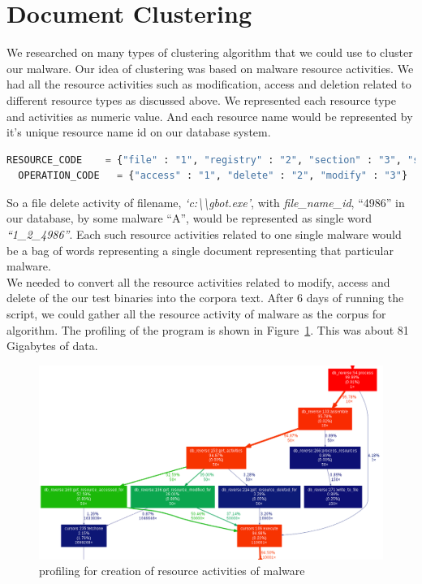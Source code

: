 \section{Document Clustering}
\label{sec:Document Clustering}
We researched on many types of clustering algorithm that we could use to cluster our malware. Our idea of clustering was based on malware resource activities.
We had all the resource activities such as modification, access and deletion related to different resource types as discussed above.
We represented each resource type and activities as numeric value. And each resource name would be represented by it's unique resource name id on our database system.
\begin{lstlisting}[language=python,caption={Numeric codes given to resource and operation},label={lbl:numericode}]
  RESOURCE_CODE    = {"file" : "1", "registry" : "2", "section" : "3", "service" : "4", "driver" : "5", "sync" : "6", "process" : "7", "job" : "8"}
  OPERATION_CODE   = {"access" : "1", "delete" : "2", "modify" : "3"}
\end{lstlisting}
So a file delete activity of filename, \textit{`c:\textbackslash\textbackslash{}gbot.exe'}, with \textit{file\_name\_id}, ``4986'' in our database, by some malware ``A'', would be represented as single word \emph{``1\_2\_4986''}. Each such resource activities related to one single malware would be a bag of words representing  a single document representing that particular malware.\\
We needed to convert all the resource activities related to modify, access and delete of the our test binaries into the corpora text.
After 6 days of running the script, we could gather all the resource activity of {\gettotalmalwareii} malware as the corpus for algorithm.
The profiling of the program is shown in Figure~\ref{fig:actcreation}.
This was about 81 Gigabytes of data.
\begin{figure}
\begin{center}
  \includegraphics[scale=0.3]{figures/activities_creation.png}
\end{center}
\caption{profiling for creation of resource activities of malware}
\label{fig:actcreation}
\end{figure}
